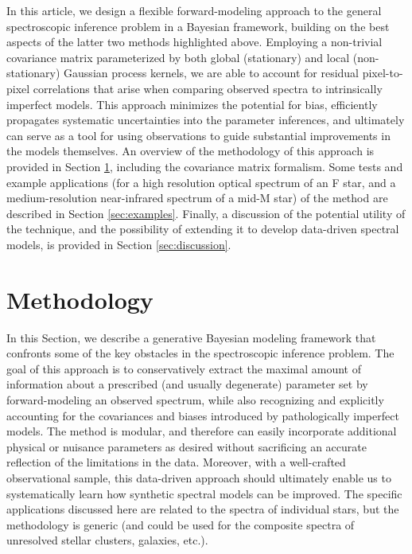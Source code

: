 \documentclass[iop,floatfix,numberedappendix,twocolappendix]{emulateapj}
\begin{document}
In this article, we design a flexible forward-modeling approach to the general spectroscopic 
inference problem in a Bayesian framework, building on the best aspects of the latter two methods 
highlighted above.  Employing a non-trivial covariance matrix parameterized by both global 
(stationary) and local (non-stationary) Gaussian process kernels, we are able to account for 
residual pixel-to-pixel correlations that arise when comparing observed spectra to intrinsically 
imperfect models.  This approach minimizes the potential for bias, efficiently propagates 
systematic uncertainties into the parameter inferences, and ultimately can serve as a tool for 
using observations to guide substantial improvements in the models themselves.  An overview of the 
methodology of this approach is provided in Section \ref{sec:method}, including the covariance 
matrix formalism.  Some tests and example applications (for a high resolution optical spectrum of 
an F star, and a medium-resolution near-infrared spectrum of a mid-M star) of the method are 
described in Section \ref{sec:examples}.  Finally, a discussion of the potential utility of the 
technique, and the possibility of extending it to develop data-driven spectral models, is provided 
in Section \ref{sec:discussion}.  \\



\section{Methodology} \label{sec:method}

In this Section, we describe a generative Bayesian modeling framework that confronts some of the 
key obstacles in the spectroscopic inference problem.  The goal of this approach is to 
conservatively extract the maximal amount of information about a prescribed (and usually 
degenerate) parameter set by forward-modeling an observed spectrum, while also recognizing and 
explicitly accounting for the covariances and biases introduced by pathologically imperfect 
models.  The method is modular, and therefore can easily incorporate additional physical or 
nuisance parameters as desired without sacrificing an accurate reflection of the limitations in the 
data.  Moreover, with a well-crafted observational sample, this data-driven approach should 
ultimately enable us to systematically learn how synthetic spectral models can be improved.  The 
specific applications discussed here are related to the spectra of individual stars, but the 
methodology is generic (and could be used for the composite spectra of unresolved stellar clusters, 
galaxies, etc.).  
\end{document}
